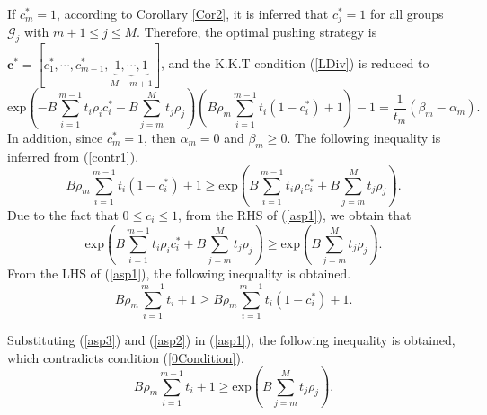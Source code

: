 \documentclass[12pt, draftclsnofoot, onecolumn]{IEEEtran}
\begin{document}
If $c_m^{\ast}=1$, according to Corollary \ref{Cor2}, it is inferred that $c_j^{\ast}=1$ for all groups $\mathcal{G}_j$ with $m+1\leq j \leq M$. Therefore, the optimal pushing strategy is
$\bm{c}^{\ast} =[c_1^{\ast}, \cdots, c_{m-1}^{\ast},\underbrace{1, \cdots, 1}_{M-m+1}]$, and the K.K.T condition (\ref {LDiv}) is reduced to
\begin{equation}\label{contr1}
\textrm{exp}\left(-B \sum\limits_{i= 1}^{m-1} t_i \rho_i c_i^{\ast}-B \sum\limits_{j= m}^{M} t_j \rho_j\right)\left( B \rho_m\sum\limits_{i= 1}^{m-1} t_i (1-c_i^{\ast}) + 1\right) - 1=\frac{1}{t_m} (\beta_m-\alpha_m).
\end{equation}
In addition, since $c_m^{\ast}=1$, then $\alpha_m=0$ and $\beta_m\geq 0$. The following inequality is inferred from (\ref{contr1}).
\begin{equation}\label{asp1}
 B \rho_m\sum\limits_{i= 1}^{m-1} t_i (1-c_i^{\ast}) + 1 \geq \textrm{exp}\left(B \sum\limits_{i= 1}^{m-1} t_i \rho_i c_i^{\ast}+B \sum\limits_{j= m}^{M} t_j \rho_j\right).
\end{equation}
Due to the fact that $0 \leq c_i \leq 1$, from the RHS of (\ref{asp1}), we obtain that
\begin{equation}\label{asp2}
\textrm{exp}\left(B \sum\limits_{i= 1}^{m-1} t_i \rho_i c_i^{\ast}+B \sum\limits_{j= m}^{M} t_j \rho_j\right)\geq \textrm{exp}(B \sum\limits_{j= m}^{M} t_j \rho_j).
\end{equation}
From the LHS of  (\ref{asp1}), the following inequality is obtained.
\begin{equation}\label{asp3}
 B \rho_m\sum\limits_{i= 1}^{m-1} t_i + 1 \geq B \rho_m\sum\limits_{i= 1}^{m-1} t_i (1-c_i^{\ast}) + 1.
\end{equation}

Substituting (\ref{asp3}) and (\ref{asp2}) in (\ref{asp1}), the following inequality is obtained, which contradicts condition (\ref{0Condition}).
\begin{equation}
 B \rho_m\sum\limits_{i= 1}^{m-1} t_i + 1 \geq \textrm{exp}(B \sum\limits_{j= m}^{M} t_j \rho_j).
\end{equation}
\end{document}
